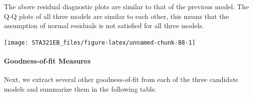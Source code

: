 \documentclass[
]{book}
\newenvironment{Shaded}{\begin{snugshade}}{\end{snugshade}}
\newcommand{\AttributeTok}[1]{\textcolor[rgb]{0.13,0.29,0.53}{#1}}
\newcommand{\CommentTok}[1]{\textcolor[rgb]{0.56,0.35,0.01}{\textit{#1}}}
\newcommand{\DecValTok}[1]{\textcolor[rgb]{0.00,0.00,0.81}{#1}}
\newcommand{\FunctionTok}[1]{\textcolor[rgb]{0.13,0.29,0.53}{\textbf{#1}}}
\newcommand{\NormalTok}[1]{#1}
\newcommand{\SpecialCharTok}[1]{\textcolor[rgb]{0.81,0.36,0.00}{\textbf{#1}}}
\newcommand{\StringTok}[1]{\textcolor[rgb]{0.31,0.60,0.02}{#1}}
\begin{document}
The above residual diagnostic plots are similar to that of the previous model. The Q-Q plots of all three models are similar to each other, this means that the assumption of normal residuals is not satisfied for all three models.

\begin{Shaded}
\end{Shaded}

\begin{center}\texttt{[image: STA321EB\_files/figure-latex/unnamed-chunk-88-1]} \end{center}

\hypertarget{goodness-of-fit-measures}{%
\paragraph{Goodness-of-fit Measures}\label{goodness-of-fit-measures}}

Next, we extract several other goodness-of-fit from each of the three candidate models and summarize them in the following table.
\end{document}
